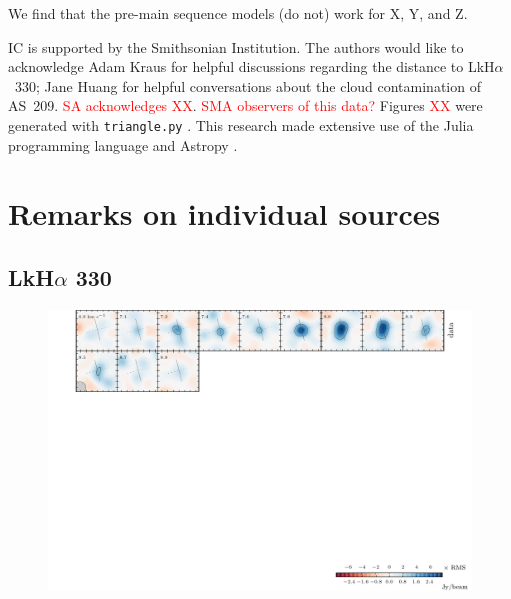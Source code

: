 \documentclass{aastex6}
\newcommand{\todo}[1]{ \textcolor{red}{#1}}
\begin{document}
We find that the pre-main sequence models (do not) work for X, Y, and Z.

\acknowledgments
IC is supported by the Smithsonian Institution. The authors would like to acknowledge Adam Kraus for helpful discussions regarding the distance to LkH$\alpha$~330; Jane Huang for helpful conversations about the cloud contamination of AS~209. \todo{SA acknowledges XX}. \todo{SMA observers of this data?}  Figures \todo{XX} were generated with \texttt{triangle.py} \citep{foreman-mackey14}. This research made extensive use of the Julia programming language \citep{julia12} and Astropy \citep{astropy13}.





\appendix

\section{Remarks on individual sources}

\subsection{LkH$\alpha$ 330}
\begin{figure}[htb]
\begin{center}
  \includegraphics{LkHa330.pdf}
  \end{center}
\end{figure}
\end{document}
